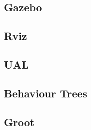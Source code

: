 \subsection{Gazebo}
\label{subsec:Gazebo}

\subsection{Rviz}
\label{subsec:Rviz}

\subsection{UAL}
\label{subsec:UAL}

\subsection{Behaviour Trees}
\label{subsec:BehaviourTrees}

\subsection{Groot}
\label{subsec:Groot}



\endinput